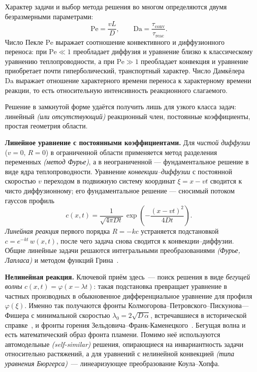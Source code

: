         Характер задачи и выбор метода решения во многом определяются двумя
        безразмерными параметрами:
        \[
            \mathrm{Pe} = \frac{v L}{D}, \qquad
            \mathrm{Da} = \frac{\tau_{\mathrm{conv}}}{\tau_{\mathrm{reac}}}.
        \]
        Число Пекле $\mathrm{Pe}$ выражает соотношение конвективного и диффузионного
        переноса: при $\mathrm{Pe} \ll 1$ преобладает диффузия и уравнение близко к
        классическому уравнению теплопроводности, а при $\mathrm{Pe} \gg 1$ преобладает
        конвекция и уравнение приобретает почти гиперболический, транспортный характер.
        Число Дамкёлера $\mathrm{Da}$ выражает отношение характерного времени переноса
        к характерному времени реакции, то есть относительную интенсивность
        реакционного слагаемого.


        Решение в замкнутой форме удаётся получить лишь для узкого класса задач:
        линейный \textit{(или отсутствующий)} реакционный член, постоянные коэффициенты,
        простая геометрия области.

        \textbf{Линейное уравнение с постоянными коэффициентами.}
        Для \textit{чистой диффузии} ($v = 0$, $R = 0$) в ограниченной области применяется
        метод разделения переменных \textit{(метод Фурье)}, а в неограниченной --- фундаментальное
        решение в виде ядра теплопроводности. Уравнение \textit{конвекции--диффузии}
        с постоянной скоростью $v$ переходом в подвижную систему координат
        $\xi = x - v t$ сводится к чисто диффузионному; его фундаментальное решение ---
        сносимый потоком гауссов профиль
        \[
            c(x, t) = \frac{1}{\sqrt{4\pi D t}}\,
            \exp\!\left(-\frac{(x - v t)^2}{4 D t}\right).
        \]
        \textit{Линейная реакция} первого порядка $R = -k c$ устраняется подстановкой
        $c = e^{-k t}\,w(x, t)$, после чего задача снова сводится к конвекции--диффузии.
        Общие линейные задачи решаются интегральными преобразованиями
        \textit{(Фурье, Лапласа)} и методом функций Грина~\cite{tihonovSamarskii1999}.

        \textbf{Нелинейная реакция.}
        Ключевой приём здесь~--- поиск решения в виде \textit{бегущей волны}
        $c(x, t) = \varphi(x - \lambda t)$: такая подстановка превращает уравнение
        в частных производных в обыкновенное дифференциальное уравнение для профиля
        $\varphi(\xi)$. Именно так получаются фронты Колмогорова--Петровского--Пискунова---Фишера
        с минимальной скоростью $\lambda_0 = 2\sqrt{D\,\alpha}$, встречавшиеся в
        исторической справке~\cite{kpp1937}, и фронты горения
        Зельдовича--Франк-Каменецкого~\cite{zeldovich1944}. Бегущая волна и есть
        математический образ фронта пламени. Помимо неё используются автомодельные
        \textit{(self-similar)} решения, опирающиеся на инвариантность задачи
        относительно растяжений, а для уравнений с нелинейной конвекцией
        \textit{(типа уравнения Бюргерса)}~--- линеаризующее преобразование Коула--Хопфа.


